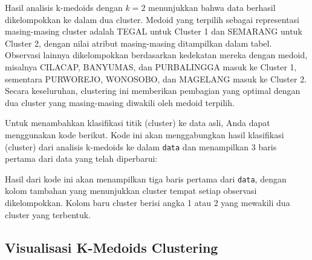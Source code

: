 \documentclass[
  oneside]{book}
\newenvironment{Shaded}{\begin{snugshade}}{\end{snugshade}}
\newcommand{\AttributeTok}[1]{\textcolor[rgb]{0.13,0.29,0.53}{#1}}
\newcommand{\CommentTok}[1]{\textcolor[rgb]{0.56,0.35,0.01}{\textit{#1}}}
\newcommand{\DecValTok}[1]{\textcolor[rgb]{0.00,0.00,0.81}{#1}}
\newcommand{\FunctionTok}[1]{\textcolor[rgb]{0.13,0.29,0.53}{\textbf{#1}}}
\newcommand{\NormalTok}[1]{#1}
\newcommand{\OtherTok}[1]{\textcolor[rgb]{0.56,0.35,0.01}{#1}}
\newcommand{\SpecialCharTok}[1]{\textcolor[rgb]{0.81,0.36,0.00}{\textbf{#1}}}
\begin{document}
Hasil analisis k-medoids dengan \(k = 2\) menunjukkan bahwa data berhasil dikelompokkan ke dalam dua cluster. Medoid yang terpilih sebagai representasi masing-masing cluster adalah TEGAL untuk Cluster 1 dan SEMARANG untuk Cluster 2, dengan nilai atribut masing-masing ditampilkan dalam tabel. Observasi lainnya dikelompokkan berdasarkan kedekatan mereka dengan medoid, misalnya CILACAP, BANYUMAS, dan PURBALINGGA masuk ke Cluster 1, sementara PURWOREJO, WONOSOBO, dan MAGELANG masuk ke Cluster 2. Secara keseluruhan, clustering ini memberikan pembagian yang optimal dengan dua cluster yang masing-masing diwakili oleh medoid terpilih.

Untuk menambahkan klasifikasi titik (cluster) ke data asli, Anda dapat menggunakan kode berikut. Kode ini akan menggabungkan hasil klasifikasi (cluster) dari analisis k-medoids ke dalam \texttt{data} dan menampilkan 3 baris pertama dari data yang telah diperbarui:

\begin{Shaded}
\end{Shaded}

Hasil dari kode ini akan menampilkan tiga baris pertama dari \texttt{data}, dengan kolom tambahan yang menunjukkan cluster tempat setiap observasi dikelompokkan. Kolom baru cluster berisi angka 1 atau 2 yang mewakili dua cluster yang terbentuk.

\subsection*{Visualisasi K-Medoids Clustering}\label{visualisasi-k-medoids-clustering}
\end{document}
